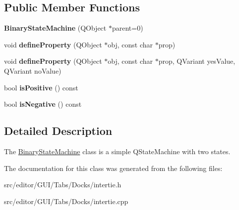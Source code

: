 \subsection*{\-Public \-Member \-Functions}
\begin{DoxyCompactItemize}
\item 
\hypertarget{class_binary_state_machine_a9e022d1bf8c0d7c2c7916c6b329d8891}{{\bfseries \-Binary\-State\-Machine} (\-Q\-Object $\ast$parent=0)}\label{class_binary_state_machine_a9e022d1bf8c0d7c2c7916c6b329d8891}

\item 
\hypertarget{class_binary_state_machine_a5996c6d83be3422a74e9bf26c30958ca}{void {\bfseries define\-Property} (\-Q\-Object $\ast$obj, const char $\ast$prop)}\label{class_binary_state_machine_a5996c6d83be3422a74e9bf26c30958ca}

\item 
\hypertarget{class_binary_state_machine_a7f9c62ef8512448a2e1afb38f29a7c0f}{void {\bfseries define\-Property} (\-Q\-Object $\ast$obj, const char $\ast$prop, \-Q\-Variant yes\-Value, \-Q\-Variant no\-Value)}\label{class_binary_state_machine_a7f9c62ef8512448a2e1afb38f29a7c0f}

\item 
\hypertarget{class_binary_state_machine_a239a6f3c579accb8bda78d6b99fb66b2}{bool {\bfseries is\-Positive} () const }\label{class_binary_state_machine_a239a6f3c579accb8bda78d6b99fb66b2}

\item 
\hypertarget{class_binary_state_machine_af943aaf719dffd6b61a76da6d10f6dd2}{bool {\bfseries is\-Negative} () const }\label{class_binary_state_machine_af943aaf719dffd6b61a76da6d10f6dd2}

\end{DoxyCompactItemize}


\subsection{\-Detailed \-Description}
\-The \hyperlink{class_binary_state_machine}{\-Binary\-State\-Machine} class is a simple \-Q\-State\-Machine with two states. 

\-The documentation for this class was generated from the following files\-:\begin{DoxyCompactItemize}
\item 
src/editor/\-G\-U\-I/\-Tabs/\-Docks/intertie.\-h\item 
src/editor/\-G\-U\-I/\-Tabs/\-Docks/intertie.\-cpp\end{DoxyCompactItemize}
